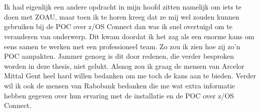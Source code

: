 
\chapter*{}%
\label{ch:voorwoord}

Ik had eigenlijk een andere opdracht in mijn hoofd zitten namelijk om iets te doen met ZOAU, maar toen ik te horen kreeg dat ze mij wel zouden kunnen gebruiken bij de POC over z/OS Connect dan was ik snel overtuigd om te veranderen van onderwerp. Dit kwam doordat ik het zag als een enorme kans om eens samen te werken met een professioneel team. Zo zou ik zien hoe zij zo'n POC aanpakten. Jammer genoeg is dit door redenen, die verder besproken worden in deze thesis, niet gelukt. Alsnog zou ik graag de mensen van Arcelor Mittal Gent heel hard willen bedanken om me toch de kans aan te bieden. Verder wil ik ook de mensen van Rabobank bedanken die me wat extra informatie hebben gegeven over hun ervaring met de installatie en de POC over z/OS Connect.
